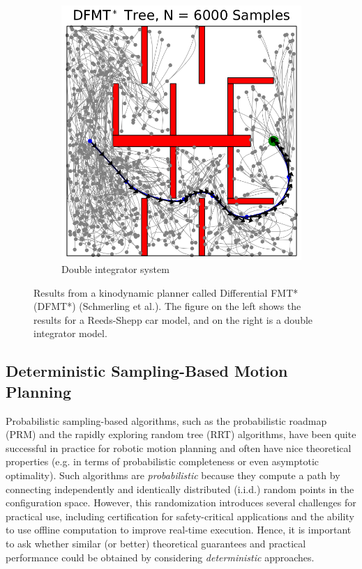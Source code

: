 \begin{figure}[ht]
\begin{subfigure}[b]{0.4\linewidth}
      \includegraphics[width=\linewidth]{tex/figs/ch06_figs/drift.png}
      \caption{Double integrator system}
    \end{subfigure}
    \caption{Results from a kinodynamic planner called Differential FMT* (DFMT*) (Schmerling et al.). The figure on the left shows the results for a Reeds-Shepp car model, and on the right is a double integrator model.}
    \label{fig:kino}
\end{figure}


\subsection{Deterministic Sampling-Based Motion Planning}

Probabilistic sampling-based algorithms, such as the probabilistic roadmap (PRM) and the rapidly exploring random tree (RRT) algorithms, have been quite successful in practice for robotic motion planning and often have nice theoretical properties (e.g. in terms of probabilistic completeness or even asymptotic optimality). Such algorithms are \textit{probabilistic} because they compute a path by connecting independently and identically distributed (i.i.d.) random points in the configuration space. However, this randomization introduces several challenges for practical use, including certification for safety-critical applications and the ability to use offline computation to improve real-time execution. Hence, it is important to ask whether similar (or better) theoretical guarantees and practical performance could be obtained by considering \textit{deterministic} approaches.

